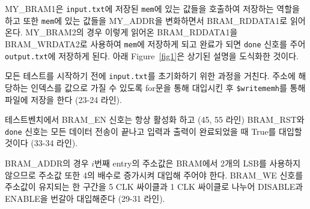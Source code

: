 \documentclass{article}
\begin{document}
MY\_BRAM1은 \texttt{input.txt}에 저장된 \texttt{mem}에 있는 값들을 호출하여 저장하는 역할을 하고 또한 \texttt{mem}에 있는 값들을 MY\_ADDR을 변화하면서 BRAM\_RDDATA1로 읽어온다. MY\_BRAM2의 경우 이렇게 읽어온 \linebreak BRAM\_RDDATA1을 BRAM\_WRDATA2로 사용하여 \texttt{mem}에 저장하게 되고 완료가 되면 \texttt{done} 신호를 주어 \linebreak \texttt{output.txt}에 저장하게 된다. 아래 Figure~\ref{fig1}은 상기된 설명을 도식화한 것이다.

\begin{itemize*}
\item 모든 테스트를 시작하기 전에 \texttt{input.txt}를 초기화하기 위한 과정을 거친다. 주소에 해당하는 인덱스를 값으로 가질 수 있도록 for문을 통해 대입시킨 후 \texttt{\$writememh}를 통해 파일에 저장을 한다 (23-24 라인).\\
\item 테스트벤치에서 BRAM\_EN 신호는 항상 활성화 하고 (45, 55 라인) BRAM\_RST와 \texttt{done} 신호는 모든 데이터 전송이 끝나고 입력과 출력이 완료되었을 때 True를 대입할 것이다 (33-34 라인).\\
\item BRAM\_ADDR의 경우 $i$번째 entry의 주소값은 BRAM에서 2개의 LSB를 사용하지 않으므로 주소값 또한 4의 배수로 증가시켜 대입해 주어야 한다. BRAM\_WE 신호를 주소값이 유지되는 한 구간을 5 CLK 싸이클과 1 CLK 싸이클로 나누어 DISABLE과 ENABLE을 번갈아 대입해준다 (29-31 라인).
\end{itemize*}
\end{document}
